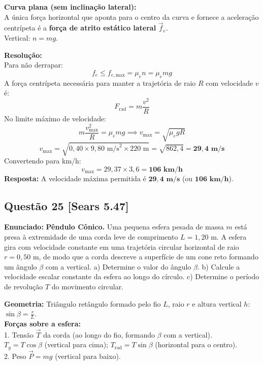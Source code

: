 \documentclass[11pt,a4paper]{article}
\begin{document}
\begin{dclbox}
\textbf{Curva plana (sem inclinação lateral):}\\
A única força horizontal que aponta para o centro da curva e fornece a aceleração centrípeta é a \textbf{força de atrito estático lateral} $\vec{f}_e$.\\
Vertical: $n = mg$.
\end{dclbox}

\noindent
\textbf{Resolução:}\\
Para não derrapar:
\[ f_e \le f_{e,\text{max}} = \mu_e n = \mu_e mg \]
A força centrípeta necessária para manter a trajetória de raio $R$ com velocidade $v$ é:
\[ F_{\text{rad}} = m \frac{v^2}{R} \]
No limite máximo de velocidade:
\[ m \frac{v_{\text{max}}^2}{R} = \mu_e mg \implies v_{\text{max}} = \sqrt{\mu_e g R} \]
\[ v_{\text{max}} = \sqrt{0,40 \times 9,80\text{ m/s}^2 \times 220\text{ m}} = \sqrt{862,4} = \mathbf{29,4\text{ m/s}} \]
Convertendo para km/h:
\[ v_{\text{max}} = 29,37 \times 3,6 = \mathbf{106\text{ km/h}} \]
\textbf{Resposta:} A velocidade máxima permitida é $\mathbf{29,4\text{ m/s}}$ (ou $\mathbf{106\text{ km/h}}$).

\vspace{0.3cm}
\subsection*{Questão 25 [Sears 5.47]}
\textbf{Enunciado:} \textbf{Pêndulo Cônico.} Uma pequena esfera pesada de massa $m$ está presa à extremidade de uma corda leve de comprimento $L = 1,20\text{ m}$. A esfera gira com velocidade constante em uma trajetória circular horizontal de raio $r = 0,50\text{ m}$, de modo que a corda descreve a superfície de um cone reto formando um ângulo $\beta$ com a vertical. a) Determine o valor do ângulo $\beta$. b) Calcule a velocidade escalar constante da esfera ao longo do círculo. c) Determine o período de revolução $T$ do movimento circular.

\begin{dclbox}
\textbf{Geometria:} Triângulo retângulo formado pelo fio $L$, raio $r$ e altura vertical $h$:\\
$\sin\beta = \frac{r}{L}$.\\
\textbf{Forças sobre a esfera:}\\
1. Tensão $\vec{T}$ da corda (ao longo do fio, formando $\beta$ com a vertical).\\
   $T_y = T\cos\beta$ (vertical para cima); $T_{\text{rad}} = T\sin\beta$ (horizontal para o centro).\\
2. Peso $\vec{P} = mg$ (vertical para baixo).
\end{dclbox}
\end{document}
